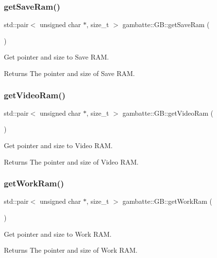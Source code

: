 \subsubsection{\texorpdfstring{get\+Save\+Ram()}{getSaveRam()}}
{\footnotesize\ttfamily std\+::pair$<$ unsigned char $\ast$, size\+\_\+t $>$ gambatte\+::\+G\+B\+::get\+Save\+Ram (\begin{DoxyParamCaption}{ }\end{DoxyParamCaption})}

Get pointer and size to Save R\+AM. \begin{DoxyReturn}{Returns}
The pointer and size of Save R\+AM. 
\end{DoxyReturn}
\mbox{\label{classgambatte_1_1GB_af72f3d0e4a022d737bff406d3327038b}} 
\subsubsection{\texorpdfstring{get\+Video\+Ram()}{getVideoRam()}}
{\footnotesize\ttfamily std\+::pair$<$ unsigned char $\ast$, size\+\_\+t $>$ gambatte\+::\+G\+B\+::get\+Video\+Ram (\begin{DoxyParamCaption}{ }\end{DoxyParamCaption})}

Get pointer and size to Video R\+AM. \begin{DoxyReturn}{Returns}
The pointer and size of Video R\+AM. 
\end{DoxyReturn}
\mbox{\label{classgambatte_1_1GB_a0781cb0969c57ddc0fa647b54ee373f6}} 
\subsubsection{\texorpdfstring{get\+Work\+Ram()}{getWorkRam()}}
{\footnotesize\ttfamily std\+::pair$<$ unsigned char $\ast$, size\+\_\+t $>$ gambatte\+::\+G\+B\+::get\+Work\+Ram (\begin{DoxyParamCaption}{ }\end{DoxyParamCaption})}

Get pointer and size to Work R\+AM. \begin{DoxyReturn}{Returns}
The pointer and size of Work R\+AM. 
\end{DoxyReturn}
\mbox{\label{classgambatte_1_1GB_a96ffbde272ed65919f851740682cac04}} 

